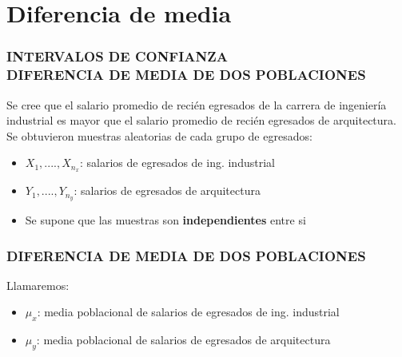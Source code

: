 \documentclass{beamer}
\begin{document}


\section{Diferencia de media}

\begin{frame}
\frametitle{INTERVALOS DE CONFIANZA\\DIFERENCIA DE MEDIA DE DOS POBLACIONES}

Se cree que el salario promedio de recién egresados de la carrera de
ingeniería industrial es mayor que el salario promedio de recién
egresados de arquitectura. Se obtuvieron muestras aleatorias de cada
grupo de egresados:
\begin{itemize}
\item $X_1,....,X_{n_x}$: salarios de egresados de ing. industrial
\item $Y_1,....,Y_{n_y}$: salarios de egresados de arquitectura
\item Se supone que las muestras son \textbf{independientes} entre si
\end{itemize}

\end{frame}


\begin{frame}
\frametitle{DIFERENCIA DE MEDIA DE DOS POBLACIONES}


Llamaremos:
\begin{itemize}
\item $\mu_x$: media poblacional de salarios de egresados de ing. industrial
\item $\mu_y$: media poblacional de salarios de egresados de arquitectura
\end{itemize}

\end{frame}
\end{document}
